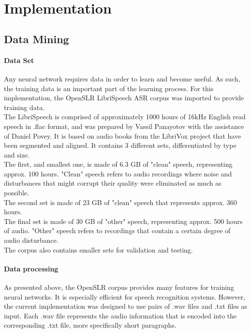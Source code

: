 \chapter{Implementation}\label{ch:implementation}

\section{Data Mining}
\subsubsection{Data Set}
Any neural network requires data in order to learn and become useful. As such, the training data is an important part of the learning process. For this implementation, the OpenSLR LibriSpeech ASR corpus was imported to provide training data.\\

The LibriSpeech is comprised of approximately 1000 hours of 16kHz English read speech in .flac format, and was prepared by Vassil Panayotov with the assistance of Daniel Povey. It is based on audio books from the LibriVox project that have been segmented and aligned. It contains 3 different sets, differentiated by type and size.\\ 
The first, and smallest one, is made of 6.3 GB of "clean" speech, representing approx. 100 hours. "Clean" speech refers to audio recordings where noise and disturbances that might corrupt their quality were eliminated as much as possible.\\ 
The second set is made of 23 GB of "clean" speech that represents approx. 360 hours.\\
The final set is made of 30 GB of "other" speech, representing approx. 500 hours of audio. "Other" speech refers to recordings that contain a certain degree of audio disturbance.\\
The corpus also contains smaller sets for validation and testing.\\

\subsubsection{Data processing}
As presented above, the OpenSLR corpus provides many features for training neural networks. It is especially efficient for speech recognition systems. However, the current implementation was designed to use pairs of .wav files and .txt files as input. Each .wav file represents the audio information that is encoded into the corresponding .txt file, more specifically short paragraphs.\\

